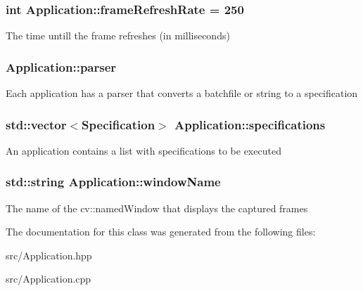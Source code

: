 \subsubsection[{\texorpdfstring{frame\+Refresh\+Rate}{frameRefreshRate}}]{\setlength{\rightskip}{0pt plus 5cm}int Application\+::frame\+Refresh\+Rate = 250\hspace{0.3cm}{\ttfamily [protected]}}\hypertarget{classApplication_a181348e18b3debfa1fa2ba936f20967d}{}\label{classApplication_a181348e18b3debfa1fa2ba936f20967d}
The time untill the frame refreshes (in milliseconds) 
\subsubsection[{\texorpdfstring{parser}{parser}}]{ Application\+::parser\hspace{0.3cm}{\ttfamily [protected]}}\hypertarget{classApplication_ad80c2b36d4feb33d203f112d3c890409}{}\label{classApplication_ad80c2b36d4feb33d203f112d3c890409}
Each application has a parser that converts a batchfile or string to a specification 
\subsubsection[{\texorpdfstring{specifications}{specifications}}]{\setlength{\rightskip}{0pt plus 5cm}std\+::vector$<${\bf Specification}$>$ Application\+::specifications\hspace{0.3cm}{\ttfamily [protected]}}\hypertarget{classApplication_a041aed976aa156e8265bca7f39c42302}{}\label{classApplication_a041aed976aa156e8265bca7f39c42302}
An application contains a list with specifications to be executed 
\subsubsection[{\texorpdfstring{window\+Name}{windowName}}]{\setlength{\rightskip}{0pt plus 5cm}std\+::string Application\+::window\+Name\hspace{0.3cm}{\ttfamily [protected]}}\hypertarget{classApplication_a931b9ffa386916ba1cfd1804823bf51b}{}\label{classApplication_a931b9ffa386916ba1cfd1804823bf51b}
The name of the cv\+::named\+Window that displays the captured frames 

The documentation for this class was generated from the following files\+:\begin{DoxyCompactItemize}
\item 
src/Application.\+hpp\item 
src/Application.\+cpp\end{DoxyCompactItemize}
